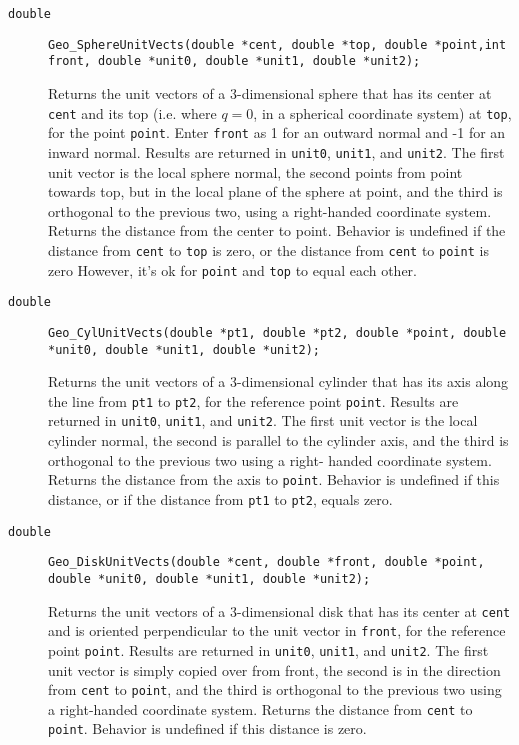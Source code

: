 \documentclass[11pt]{article}
\newcommand {\ttt} {\texttt}
\begin{document}
\begin{description}
\item[\ttt{double}]
\ttt{Geo\_SphereUnitVects(double *cent, double *top, double *point,int front, double *unit0, double *unit1, double *unit2);}

Returns the unit vectors of a 3-dimensional sphere that has its center at \ttt{cent} and its
top (i.e. where $q=0$, in a spherical coordinate system) at \ttt{top}, for the point \ttt{point}. Enter \ttt{front} as 1 for an outward normal and -1 for an inward normal. Results are returned in \ttt{unit0}, \ttt{unit1}, and \ttt{unit2}. The first unit vector is the local sphere normal, the second points from point towards top, but in the local plane of the sphere at point, and the third is orthogonal to the previous two, using a right-handed coordinate system. Returns the distance from the center to point. Behavior is undefined if the distance from \ttt{cent} to \ttt{top} is zero, or the distance from \ttt{cent} to \ttt{point} is zero However, it's ok for \ttt{point} and \ttt{top} to equal each other.

\item[\ttt{double}]
\ttt{Geo\_CylUnitVects(double *pt1, double *pt2, double *point, double *unit0, double *unit1, double *unit2);}

Returns the unit vectors of a 3-dimensional cylinder that has its axis along the line from \ttt{pt1} to \ttt{pt2}, for the reference point \ttt{point}. Results are returned in \ttt{unit0}, \ttt{unit1}, and \ttt{unit2}. The first unit vector is the local cylinder normal, the second is parallel to the cylinder axis, and the third is orthogonal to the previous two using a right- handed coordinate system. Returns the distance from the axis to \ttt{point}. Behavior is undefined if this distance, or if the distance from \ttt{pt1} to \ttt{pt2}, equals zero.

\item[\ttt{double}]
\ttt{Geo\_DiskUnitVects(double *cent, double *front, double *point, double *unit0, double *unit1, double *unit2);}

Returns the unit vectors of a 3-dimensional disk that has its center at \ttt{cent} and is oriented perpendicular to the unit vector in \ttt{front}, for the reference point \ttt{point}. Results are returned in \ttt{unit0}, \ttt{unit1}, and \ttt{unit2}. The first unit vector is simply copied over from front, the second is in the direction from \ttt{cent} to \ttt{point}, and the third is orthogonal to the previous two using a right-handed coordinate system. Returns the distance from \ttt{cent} to \ttt{point}. Behavior is undefined if this distance is zero.





\end{description}
\end{document}
